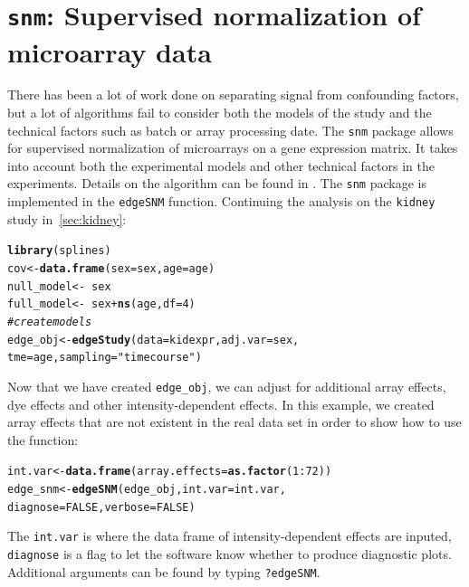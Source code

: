 \documentclass{article}\usepackage[]{graphicx}\usepackage[]{color}
\makeatletter
\newcommand{\hlnum}[1]{\textcolor[rgb]{0.686,0.059,0.569}{#1}}%
\newcommand{\hlstr}[1]{\textcolor[rgb]{0.192,0.494,0.8}{#1}}%
\newcommand{\hlcom}[1]{\textcolor[rgb]{0.678,0.584,0.686}{\textit{#1}}}%
\newcommand{\hlopt}[1]{\textcolor[rgb]{0,0,0}{#1}}%
\newcommand{\hlstd}[1]{\textcolor[rgb]{0.345,0.345,0.345}{#1}}%
\newcommand{\hlkwb}[1]{\textcolor[rgb]{0.69,0.353,0.396}{#1}}%
\newcommand{\hlkwc}[1]{\textcolor[rgb]{0.333,0.667,0.333}{#1}}%
\newcommand{\hlkwd}[1]{\textcolor[rgb]{0.737,0.353,0.396}{\textbf{#1}}}%
\newenvironment{kframe}{%
 \def\at@end@of@kframe{}%
 \ifinner\ifhmode%
  \def\at@end@of@kframe{\end{minipage}}%
  \begin{minipage}{\columnwidth}%
 \fi\fi%
 \def\FrameCommand##1{\hskip\@totalleftmargin \hskip-\fboxsep
 \colorbox{shadecolor}{##1}\hskip-\fboxsep
     \hskip-\linewidth \hskip-\@totalleftmargin \hskip\columnwidth}%
 \MakeFramed {\advance\hsize-\width
   \@totalleftmargin\z@ \linewidth\hsize
   \@setminipage}}%
 {\par\unskip\endMakeFramed%
 \at@end@of@kframe}
\newenvironment{knitrout}{}{} %
\makeatother
\begin{document}
\section{{\tt snm}: Supervised normalization of microarray data}
There has been a lot of work done on separating signal from confounding factors, but a lot of algorithms fail to consider both the models of the study and the technical factors such as batch or array processing date. The {\tt snm} package allows for supervised normalization of microarrays on a gene expression matrix. It takes into account both the experimental models and other technical factors in the experiments. Details on the algorithm can be found in \cite{mecham:2010}. The {\tt snm} package is implemented in the {\tt edgeSNM} function. Continuing the analysis on the {\tt kidney} study in~\ref{sec:kidney}:
\begin{knitrout}
\color{fgcolor}\begin{kframe}
\begin{alltt}
\hlkwd{library}\hlstd{(splines)}
\hlstd{cov} \hlkwb{<-} \hlkwd{data.frame}\hlstd{(}\hlkwc{sex} \hlstd{= sex,} \hlkwc{age} \hlstd{= age)}
\hlstd{null_model} \hlkwb{<-} \hlopt{~}\hlstd{sex}
\hlstd{full_model} \hlkwb{<-} \hlopt{~}\hlstd{sex} \hlopt{+} \hlkwd{ns}\hlstd{(age,} \hlkwc{df} \hlstd{=} \hlnum{4}\hlstd{)}
\hlcom{# create models}
\hlstd{edge_obj} \hlkwb{<-} \hlkwd{edgeStudy}\hlstd{(}\hlkwc{data} \hlstd{= kidexpr,} \hlkwc{adj.var} \hlstd{= sex,}
    \hlkwc{tme} \hlstd{= age,} \hlkwc{sampling} \hlstd{=} \hlstr{"timecourse"}\hlstd{)}
\end{alltt}
\end{kframe}
\end{knitrout}
Now that we have created {\tt edge\_obj}, we can adjust for additional array effects, dye effects and other intensity-dependent effects.  In this example, we created array effects that are not existent in the real data set in order to show how to use the function:
\begin{knitrout}
\color{fgcolor}\begin{kframe}
\begin{alltt}
\hlstd{int.var} \hlkwb{<-} \hlkwd{data.frame}\hlstd{(}\hlkwc{array.effects} \hlstd{=} \hlkwd{as.factor}\hlstd{(}\hlnum{1}\hlopt{:}\hlnum{72}\hlstd{))}
\hlstd{edge_snm} \hlkwb{<-} \hlkwd{edgeSNM}\hlstd{(edge_obj,} \hlkwc{int.var} \hlstd{= int.var,}
    \hlkwc{diagnose} \hlstd{=} \hlnum{FALSE}\hlstd{,} \hlkwc{verbose} \hlstd{=} \hlnum{FALSE}\hlstd{)}
\end{alltt}
\end{kframe}
\end{knitrout}
The {\tt int.var} is where the data frame of intensity-dependent effects are inputed, {\tt diagnose} is a flag to let the software know whether to produce diagnostic plots. Additional arguments can be found by typing {\tt ?edgeSNM}.
\end{document}
